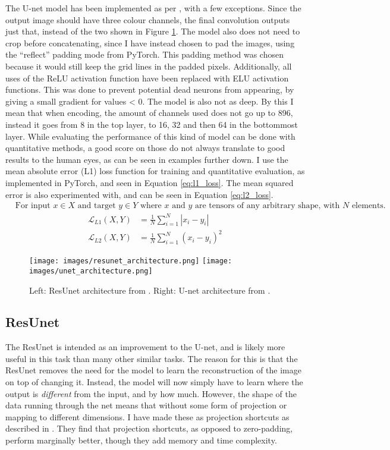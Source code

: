 The U-net model has been implemented as per \cite{unet}, with a few exceptions. Since the output image should have three colour channels, the final convolution outputs just that, instead of the two shown in Figure \ref{img:architectures}. The model also does not need to crop before concatenating, since I have instead chosen to pad the images, using the ``reflect'' padding mode from PyTorch. This padding method was chosen because it would still keep the grid lines in the padded pixels. Additionally, all uses of the ReLU activation function have been replaced with ELU activation functions. This was done to prevent potential dead neurons from appearing, by giving a small gradient for values < 0. The model is also not as deep. By this I mean that when encoding, the amount of channels used does not go up to 896, instead it goes from 8 in the top layer, to 16, 32 and then 64 in the bottommost layer. While evaluating the performance of this kind of model can be done with quantitative methods, a good score on those do not always translate to good results to the human eyes, as can be seen in examples further down. I use the mean absolute error (L1) loss function for training and quantitative evaluation, as implemented in PyTorch, and seen in Equation \ref{eq:l1_loss}. The mean squared error is also experimented with, and can be seen in Equation \ref{eq:l2_loss}.
\begin{align*}
  &\text{For input $x\in X$ and target $y\in Y$ where $x$ and $y$ are tensors of any arbitrary shape, with $N$ elements.}
\end{align*}
\begin{align}
  \mathcal{L}_{L1}(X,Y) &= \frac{1}{N} \sum^N_{i=1} |x_i - y_i| \label{eq:l1_loss}\\
  \mathcal{L}_{L2}(X,Y) &= \frac{1}{N} \sum^N_{i=1} (x_i - y_i)^2 \label{eq:l2_loss}
\end{align}

\begin{figure}[H]
  \centering
  \captionsetup{justification=centering}
  \texttt{[image: images/resunet\_architecture.png]}
  \texttt{[image: images/unet\_architecture.png]}
  \caption[center]{Left: ResUnet architecture from \cite{resunet}. Right: U-net architecture from \cite{unet}.}\label{img:architectures}
\end{figure}

\subsection{ResUnet}
The ResUnet is intended as an improvement to the U-net, and is likely more useful in this task than many other similar tasks. The reason for this is that the ResUnet removes the need for the model to learn the reconstruction of the image on top of changing it. Instead, the model will now simply have to learn where the output is \textit{different} from the input, and by how much. However, the shape of the data running through the net means that without some form of projection or mapping to different dimensions. I have made these as projection shortcuts as described in \cite{residual}. They find that projection shortcuts, as opposed to zero-padding, perform marginally better, though they add memory and time complexity.

